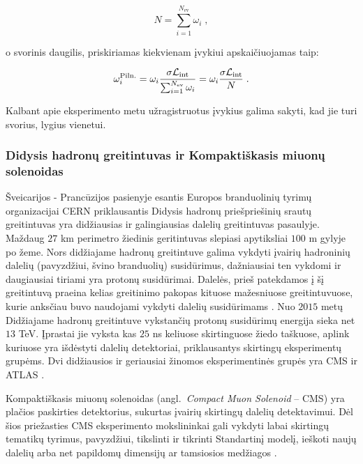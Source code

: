 \documentclass[a4paper, 12pt]{article}
\newcommand{\Lumi}{{\cal L}_\mathrm{int}}
\newlength\q
\begin{document}
\begin{equation}
	N = \sum_{i=1}^{N_{\mathrm{ev}}} \omega_{i} \; ,
	\label{eq:NLOweight}
\end{equation}

o svorinis daugilis, priskiriamas kiekvienam įvykiui apskaičiuojamas taip:

\begin{equation}
	\omega_{i}^{\mathrm{Piln.}} = \omega_{i} \frac{ \sigma\Lumi }{ \sum_{i=1}^{N_{\mathrm{ev}}}\omega_{i} } =
	\omega_{i} \frac{ \sigma\Lumi }{N} \; .
\end{equation}

Kalbant apie eksperimento metu užragistruotus įvykius galima sakyti, kad jie turi svorius, lygius vienetui.


\subsubsection{Didysis hadronų greitintuvas ir Kompaktiškasis miuonų solenoidas}

Šveicarijos - Prancūzijos pasienyje esantis Europos branduolinių tyrimų organizacijai CERN
priklausantis Didysis hadronų priešpriešinių srautų greitintuvas yra didžiausias ir galingiausias
dalelių greitintuvas pasaulyje.
Maždaug $27$ km perimetro žiedinis geritintuvas slepiasi apytiksliai $100$ m gylyje po žeme.
Nors didžiajame hadronų greitintuve galima vykdyti įvairių hadroninių dalelių (pavyzdžiui, švino
branduolių) susidūrimus, dažniausiai ten vykdomi ir daugiausiai tiriami yra protonų susidūrimai.
Dalelės, prieš patekdamos į šį greitintuvą praeina kelias greitinimo pakopas kituose mažesniuose
greitintuvuose, kurie anksčiau buvo naudojami vykdyti dalelių susidūrimams \cite{accelerators}.
Nuo $2015$ metų Didžiajame hadronų greitintuve vykstančių protonų susidūrimų energija sieka net $13$ TeV.
Įprastai jie vyksta kas $25$ ns keliuose skirtinguose žiedo taškuose, aplink kuriuose yra išdėstyti dalelių
detektoriai, priklausantys skirtingų eksperimentų grupėms.
Dvi didžiausios ir geriausiai žinomos eksperimentinės grupės yra CMS ir ATLAS \cite{LHCexperiments}.

Kompaktiškasis miuonų solenoidas (angl.\ \textit{Compact Muon Solenoid} -- CMS) yra plačios paskirties
detektorius, sukurtas įvairių skirtingų dalelių detektavimui.
Dėl šios priežasties CMS eksperimento mokslininkai gali vykdyti labai skirtingų tematikų tyrimus,
pavyzdžiui, tikslinti ir tikrinti Standartinį modelį, ieškoti naujų dalelių arba net papildomų
dimensijų ar tamsiosios medžiagos \cite{aboutCMS}.
\end{document}
